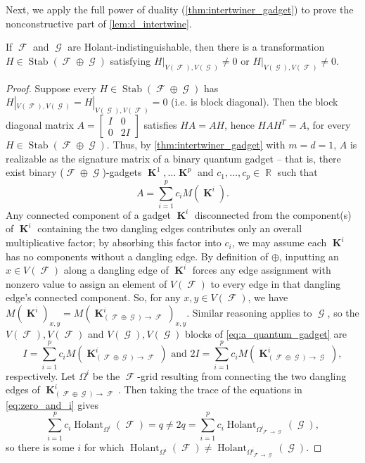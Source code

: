 \documentclass{theoretics}
\DeclareMathOperator{\rr}{\mathbb{R}}
\DeclareMathOperator{\vk}{\mathbf{K}}
\DeclareMathOperator{\fc}{\mathcal{F}}
\DeclareMathOperator{\gc}{\mathcal{G}}
\DeclareMathOperator{\stab}{Stab}
\DeclareMathOperator{\holant}{Holant}
\begin{document}
Next, we apply the full power of duality (\autoref{thm:intertwiner_gadget}) to prove the
nonconstructive part of \autoref{lem:d_intertwine}.
\begin{lemma} \label{lem:offdiagblock}
    If $\fc$ and $\gc$ are Holant-indistinguishable, then there is a transformation
    $H \in \stab(\fc \oplus \gc)$ satisfying $H|_{V(\fc),V(\gc)} \neq 0$ or 
    $H|_{V(\gc),V(\fc)} \neq 0$.
\end{lemma}
\begin{proof}
    Suppose every $H \in \stab(\fc \oplus \gc)$ has $H|_{V(\fc),V(\gc)} = H|_{V(\gc),V(\fc)} = 0$
    (i.e. is block diagonal). Then the block diagonal
    matrix $A = \begin{bmatrix} I & 0 \\ 0 & 2I \end{bmatrix}$
    satisfies $H A = A H$, hence $HAH^T = A$, for every $H \in \stab(\fc \oplus \gc)$. Thus,
    by \autoref{thm:intertwiner_gadget} with $m=d=1$, $A$ is realizable as the signature matrix 
    of a binary quantum gadget
    -- that is, there exist binary ($\fc \oplus \gc$)-gadgets $\vk^1, \ldots \vk^p$ and
    $c_1,\ldots,c_p \in \rr$ such that
    \begin{equation}
        \label{eq:a_quantum_gadget}
        A = \sum_{i=1}^p c_i M(\vk^i).
    \end{equation}
    Any connected component of a gadget $\vk^i$ disconnected from the component(s) of $\vk^i$ containing the
    two dangling edges contributes only an overall multiplicative factor; by absorbing this factor
    into $c_i$, we may assume each $\vk^i$ has no components without a dangling edge. By definition
    of $\oplus$, inputting an
    $x \in V(\fc)$ along a dangling edge of $\vk^i$ forces any edge assignment with nonzero value to 
    assign
    an element of $V(\fc)$ to every edge in that dangling edge's connected component. So, for any $x,y \in V(\fc)$,
    we have $M(\vk^i)_{x,y} = M(\vk^i_{(\fc \oplus \gc) \to \fc})_{x,y}$. 
    Similar reasoning applies to
    $\gc$, so the $V(\fc),V(\fc)$ and $V(\gc),V(\gc)$ blocks of \eqref{eq:a_quantum_gadget} are
    \begin{equation}
        I = \sum_{i=1}^p c_i M(\vk^i_{(\fc \oplus \gc) \to \fc})
        \text{ and }
        2I = \sum_{i=1}^p c_i M(\vk^i_{(\fc \oplus \gc) \to \gc}),
        \label{eq:zero_and_i}
    \end{equation}
    respectively.
    Let $\Omega^i$ be the $\fc$-grid resulting from connecting the two dangling edges of 
    $\vk^i_{(\fc \oplus \gc) \to \fc}$. Then
    taking the trace of the equations in \eqref{eq:zero_and_i} gives
    \[
        \sum_{i=1}^p c_i \holant_{\Omega^i}(\fc) = q \neq 2q = 
        \sum_{i=1}^p c_i \holant_{\Omega^i_{\fc\to\gc}}(\gc),
    \]
    so there is some $i$ for which $\holant_{\Omega^i}(\fc) \neq \holant_{\Omega^i_{\fc\to\gc}}(\gc)$.
\end{proof}
\end{document}
